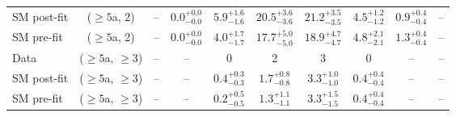 \begin{table}[h!]
{\begin{tabular}{lccccccccc}
	SM post-fit & ($\ge5$a, 2)      & --                             & $0.0^{+ 0.0 }_{- 0.0 }$        & $5.9^{+ 1.6 }_{- 1.6 }$     & $20.5^{+ 3.6 }_{- 3.6 }$    & $21.2^{+ 3.5 }_{- 3.5 }$    & $4.5^{+ 1.2 }_{- 1.2 }$  & $0.9^{+ 0.4 }_{- 0.4 }$  & --           \\[0.5ex] 
	SM pre-fit  & ($\ge5$a, 2)      & --                             & $0.0^{+ 0.0 }_{- 0.0 }$        & $4.0^{+ 1.7 }_{- 1.7 }$     & $17.7^{+ 5.0 }_{- 5.0 }$    & $18.9^{+ 4.7 }_{- 4.7 }$    & $4.8^{+ 2.1 }_{- 2.1 }$  & $1.3^{+ 0.4 }_{- 0.4 }$  & --           \\[0.5ex] 
	Data        & ($\ge5$a, $\ge3$) & --                             & --                             & 0                           & 2                           & 3                           & 0                        & --                       & --           \\[0.5ex] 
	SM post-fit & ($\ge5$a, $\ge3$) & --                             & --                             & $0.4^{+ 0.3 }_{- 0.3 }$     & $1.7^{+ 0.8 }_{- 0.8 }$     & $3.3^{+ 1.0 }_{- 1.0 }$     & $0.4^{+ 0.4 }_{- 0.4 }$  & --                       & --           \\[0.5ex] 
	SM pre-fit  & ($\ge5$a, $\ge3$) & --                             & --                             & $0.2^{+ 0.5 }_{- 0.5 }$     & $1.3^{+ 1.1 }_{- 1.1 }$     & $3.3^{+ 1.5 }_{- 1.5 }$     & $0.4^{+ 0.4 }_{- 0.4 }$  & --                       & --           \\[0.5ex] 
	\hline
	\hline
\end{tabular}}
\end{table}

